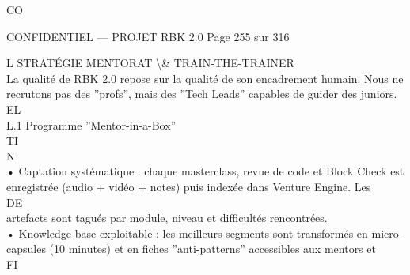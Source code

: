 \documentclass[12pt,landscape,a4paper]{article}
\newenvironment{confidential}
{\begin{tcolorbox}[
    colback=rbkred!5!white,
    colframe=rbkred!75!black,
    title=CONFIDENTIEL,
    fonttitle=\bfseries\color{white},
    coltitle=rbkred!75!black,
    breakable,
    enhanced,
    frame hidden,
    borderline west={2pt}{0pt}{rbkred!75!black}
]}
{\end{tcolorbox}}
\begin{document}
CO\\
\vspace{0.5em}
\vspace{0.5em}
\vspace{0.5em}
\vspace{0.5em}
\begin{confidential}CONFIDENTIEL — PROJET RBK 2.0                                            Page 255 sur 316\end{confidential}
L \textbar{} STRATÉGIE MENTORAT \textbackslash{}& TRAIN-THE-TRAINER\\
\vspace{0.5em}
\vspace{0.5em}
La qualité de RBK 2.0 repose sur la qualité de son encadrement humain. Nous ne recrutons pas des ”profs”, mais des ”Tech Leads” capables de guider des juniors.\\
\vspace{0.5em}
\vspace{0.5em}
\vspace{0.5em}
\vspace{0.5em}
EL\\
L.1 Programme ”Mentor-in-a-Box”\\
\vspace{0.5em}
\vspace{0.5em}
\vspace{0.5em}
\vspace{0.5em}
TI\\
N\\
• Captation systématique : chaque masterclass, revue de code et Block Check est enregistrée (audio + vidéo + notes) puis indexée dans Venture Engine. Les\\
\vspace{0.5em}
\vspace{0.5em}
\vspace{0.5em}
\vspace{0.5em}
DE\\
artefacts sont tagués par module, niveau et difficultés rencontrées.\\
\vspace{0.5em}
• Knowledge base exploitable : les meilleurs segments sont transformés en micro-capsules (10 minutes) et en fiches ”anti-patterns” accessibles aux mentors et\\
\vspace{0.5em}
\vspace{0.5em}
\vspace{0.5em}
\vspace{0.5em}
FI\\
\end{document}
